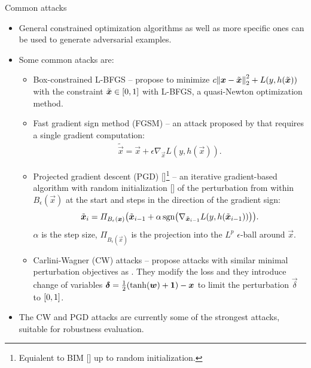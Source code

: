\documentclass{beamer}
\newcommand{\citet}[1]{{\color{citecolor}\relscale{0.8}\textcite{#1}}}
\newcommand{\citep}[1]{{\color{citecolor}\relscale{0.8}[\textcite{#1}]}}
\begin{document}
\begin{frame}[allowframebreaks=0.9]{Common attacks}
	\begin{itemize}
		\item General constrained optimization algorithms as well as more specific ones can be used to generate adversarial examples.
		\item Some common atacks are:
		\begin{itemize}
			\item Box-constrained L-BFGS -- \citet{Szegedy:2013:IPNN} propose to minimize $c\enVert{\vec x -\tilde{\vec x}}_2^2+L(y,h(\tilde{\vec x}))$ with the constraint $\tilde{\vec x}\in\intcc{0,1}$ with L-BFGS, a quasi-Newton optimization method.
			\item Fast gradient sign method (FGSM) -- an attack proposed by \citet{Goodfellow:2014:EHAE} that requires a single gradient computation:
			\begin{align}
			\tilde{\vec x} = \vec x + \epsilon\nabla_{\vec x} L(y,h(\vec x)) \text{.}
			\end{align} 
			\item Projected gradient descent (PGD) \citep{Madry:2017:TDLMRAA}\footnote[frame]{Equialent to BIM \citep{Kurakin:2016:AMLS} up to random initialization.} -- an iterative gradient-based algorithm with random initialization \citep{Madry:2017:TDLMRAA} of the perturbation from within $B_\epsilon(\vec x)$ at the start and steps in the direction of the gradient sign:
			\begin{equation} \label{eq:pgd}
			\tilde{\vec x}_i = \Pi_{B_\epsilon(\vec x)} \del{\tilde{\vec x}_{i-1} + \alpha\sgn\del{\nabla_{\tilde{\vec x}_{i-1}} L(y,h(\tilde{\vec x}_{i-1}))}} \text{.}
			\end{equation}
			$\alpha$ is the step size, $\Pi_{B_\epsilon(\vec x)}$ is the projection into the $L^p$ $\epsilon$-ball around $\vec x$.
			\item Carlini-Wagner (CW) attacks -- \citet{Carlini:2017:TERNN} propose attacks with similar minimal perturbation objectives as \citet{Szegedy:2013:IPNN} 
			. They modify the loss and they introduce change of variables $\vec\delta=\frac{1}{2}\del{\tanh\del{\vec w} + \cvec 1} - \vec x$ to limit the perturbation $\vec\delta$ to $\intcc{0,1}$. 
		\end{itemize}
		\item The CW and PGD attacks are currently some of the strongest attacks, suitable for robustness evaluation.		
	\end{itemize}
\end{frame}
\end{document}
